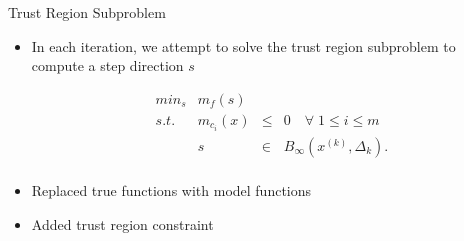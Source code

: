 \documentclass{beamer}
\newcommand{\xk}{{{x}^{(k)}}}
\newcommand{\dk}{{\Delta_k}}
\newcommand{\mk}{{m_f}}
\newcommand{\mck}{{m_{c_i}}}
\newcommand{\bk}{{B_{\infty}(\xk, \dk)}}
\begin{document}
\begin{frame}{Trust Region Subproblem}
    \begin{itemize}
        \item In each iteration, we attempt to solve the trust region subproblem to compute a step direction $s$

        \begin{displaymath}
\begin{array}{lrcc}
min_s & \mk(s)   &     &            \\
s.t.  &  \mck(x) & \le & 0   \quad \forall \; 1 \le i \le m       \\
      &  s & \in & \bk.  \\
\end{array}
        \end{displaymath}
        \item Replaced true functions with model functions
        \item Added trust region constraint
    \end{itemize}
\end{frame}





\end{document}

